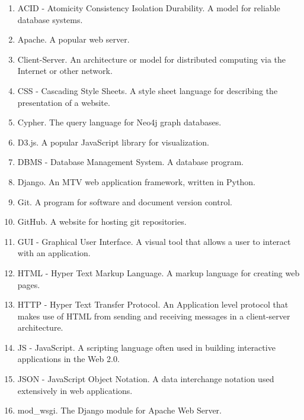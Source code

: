\documentclass[12pt,onecolumn]{article}
\begin{document}
	\begin{enumerate}
		\item ACID - Atomicity Consistency Isolation Durability. A model for reliable database systems.

		\item Apache. A popular web server.

		\item Client-Server. An architecture or model for distributed computing via the Internet or other network.

		\item CSS - Cascading Style Sheets. A style sheet language for describing the presentation of a website.

		\item Cypher. The query language for Neo4j graph databases.

		\item D3.js. A popular JavaScript library for visualization.

		\item DBMS - Database Management System. A database program.

		\item Django. An MTV web application framework, written in Python.

		\item Git. A program for software and document version control.

		\item GitHub. A website for hosting git repositories.

		\item GUI - Graphical User Interface. A visual tool that allows a user to interact with an application.

		\item HTML - Hyper Text Markup Language. A markup language for creating web pages.

		\item HTTP - Hyper Text Transfer Protocol. An Application level protocol that makes use of HTML from sending and receiving messages in a client-server architecture.

		\item JS - JavaScript. A scripting language often used in building interactive applications in the Web 2.0.

		\item JSON - JavaScript Object Notation. A data interchange notation used extensively in web applications.

		\item mod\_wsgi. The Django module for Apache Web Server.


\end{enumerate}
\end{document}
